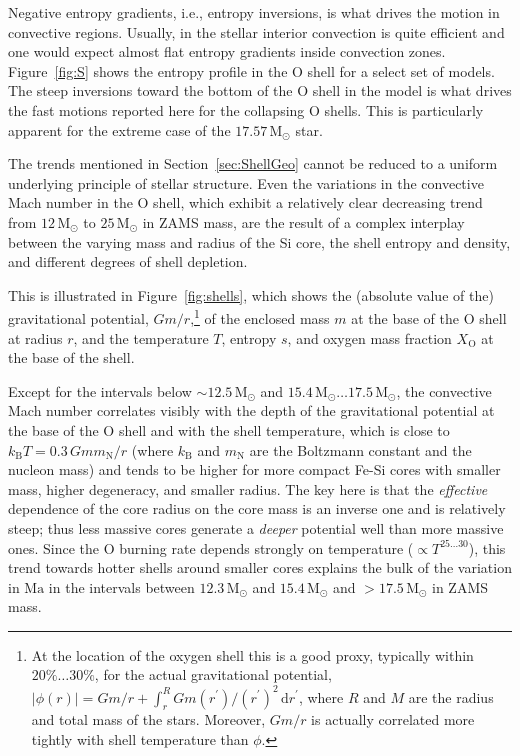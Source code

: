 \documentclass[useAMS,usenatbib]{mnras}
\newcommand{\kB}{k_\mathrm{B}}
\newcommand{\Msun}{\ensuremath{\mathrm{M}_\odot}}
\begin{document}
Negative entropy gradients, i.e., entropy inversions, is what drives the motion in convective regions.  Usually, in the stellar interior convection is quite efficient and one would expect almost flat entropy gradients inside convection zones.  Figure~\ref{fig:S} shows the entropy profile in the O shell for a select set of models.  The steep inversions toward the bottom of the O shell in the model is what drives the fast motions reported here for the collapsing O shells.  This is particularly apparent for the extreme case of the $17.57\,\Msun$ star.

The trends mentioned in Section~\ref{sec:ShellGeo} cannot be reduced to a uniform underlying principle of stellar structure.  Even the variations in the convective Mach number in the O shell, which exhibit a relatively clear decreasing trend from $12\,\Msun$ to $25\,\Msun$ in ZAMS mass, are the result of a complex interplay between the varying mass and radius of the Si core, the shell entropy and density, and different degrees of shell depletion.

This is illustrated in Figure~\ref{fig:shells}, which shows the (absolute value of the) gravitational potential, $Gm/r$,\footnote{At the location of the oxygen shell this is a good proxy, typically within $20\% \ldots 30\%$, for the actual gravitational potential, $\left|\phi(r)\right|=Gm/r+\int_r^R Gm(r^\prime)/(r^\prime)^2\,\mathrm{d}r^\prime$, where $R$ and $M$ are the radius and total mass of the stars.
Moreover, $Gm/r$ is actually correlated more tightly
with shell temperature than $\phi$.} of the enclosed mass $m$ at the base of the O shell at radius $r$, and the temperature $T$, entropy $s$, and oxygen mass fraction $X_\mathrm{O}$ at the base of the shell.  


Except for the intervals below $\mathord{\sim}12.5\,\Msun$ and
$15.4\,\Msun\ldots 17.5\,\Msun$, the convective Mach number correlates
visibly with the depth of the gravitational potential at the base of
the O shell and with the shell temperature, which is close to $\kB
T=0.3\,Gm m_\mathrm{N}/r$ (where $\kB$ and $m_\mathrm{N}$ are the
Boltzmann constant and the nucleon mass) and tends to be higher for
more compact Fe-Si cores with smaller mass, higher degeneracy, and
smaller radius.  The key here is that the \emph{effective}
  dependence of the core radius on the core mass is an inverse one and
  is relatively steep; thus less massive cores generate a
  \emph{deeper} potential well than more massive ones. Since the O
burning rate depends strongly on temperature ($\propto T^{25\ldots
  30}$), this trend towards hotter shells around smaller cores
explains the bulk of the variation in $\mathrm{Ma}$ in the intervals
between $12.3\,\Msun$ and $15.4\,\Msun$ and $>17.5 \,\Msun$ in ZAMS
mass.
\end{document}
